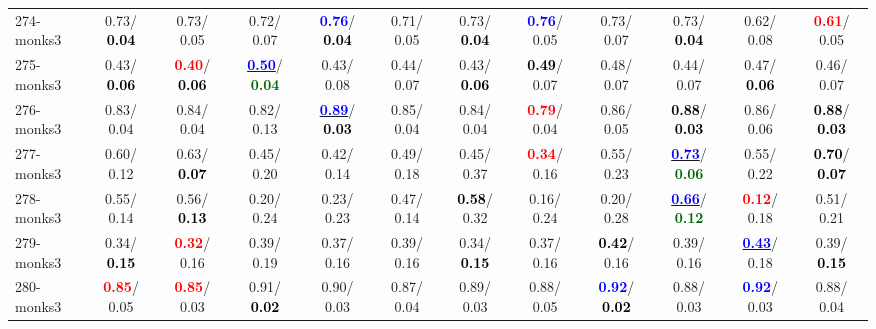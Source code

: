 \begin{table}[h]
\begin{center}
{\begin{tabular}{lc|c|c|c|c|c|c|c|c|c|c}
274-monks3 &   0.73/\textcolor{black}{\textbf{  0.04}} &   0.73/  0.05 &   0.72/  0.07 & \textcolor{blue}{\textbf{  0.76}}/\textcolor{black}{\textbf{  0.04}} &   0.71/  0.05 &   0.73/\textcolor{black}{\textbf{  0.04}} & \textcolor{blue}{\textbf{  0.76}}/  0.05 &   0.73/  0.07 &   0.73/\textcolor{black}{\textbf{  0.04}} &   0.62/  0.08 & \textcolor{red}{\textbf{  0.61}}/  0.05 \\
275-monks3 &   0.43/\textcolor{black}{\textbf{  0.06}} & \textcolor{red}{\textbf{  0.40}}/\textcolor{black}{\textbf{  0.06}} & \underline{\textcolor{blue}{\textbf{  0.50}}}/\textcolor{darkgreen}{\textbf{  0.04}} &   0.43/  0.08 &   0.44/  0.07 &   0.43/\textcolor{black}{\textbf{  0.06}} & \textcolor{black}{\textbf{  0.49}}/  0.07 &   0.48/  0.07 &   0.44/  0.07 &   0.47/\textcolor{black}{\textbf{  0.06}} &   0.46/  0.07 \\
276-monks3 &   0.83/  0.04 &   0.84/  0.04 &   0.82/  0.13 & \underline{\textcolor{blue}{\textbf{  0.89}}}/\textcolor{black}{\textbf{  0.03}} &   0.85/  0.04 &   0.84/  0.04 & \textcolor{red}{\textbf{  0.79}}/  0.04 &   0.86/  0.05 & \textcolor{black}{\textbf{  0.88}}/\textcolor{black}{\textbf{  0.03}} &   0.86/  0.06 & \textcolor{black}{\textbf{  0.88}}/\textcolor{black}{\textbf{  0.03}} \\
277-monks3 &   0.60/  0.12 &   0.63/\textcolor{black}{\textbf{  0.07}} &   0.45/  0.20 &   0.42/  0.14 &   0.49/  0.18 &   0.45/  0.37 & \textcolor{red}{\textbf{  0.34}}/  0.16 &   0.55/  0.23 & \underline{\textcolor{blue}{\textbf{  0.73}}}/\textcolor{darkgreen}{\textbf{  0.06}} &   0.55/  0.22 & \textcolor{black}{\textbf{  0.70}}/\textcolor{black}{\textbf{  0.07}} \\ \hline
278-monks3 &   0.55/  0.14 &   0.56/\textcolor{black}{\textbf{  0.13}} &   0.20/  0.24 &   0.23/  0.23 &   0.47/  0.14 & \textcolor{black}{\textbf{  0.58}}/  0.32 &   0.16/  0.24 &   0.20/  0.28 & \underline{\textcolor{blue}{\textbf{  0.66}}}/\textcolor{darkgreen}{\textbf{  0.12}} & \textcolor{red}{\textbf{  0.12}}/  0.18 &   0.51/  0.21 \\
279-monks3 &   0.34/\textcolor{black}{\textbf{  0.15}} & \textcolor{red}{\textbf{  0.32}}/  0.16 &   0.39/  0.19 &   0.37/  0.16 &   0.39/  0.16 &   0.34/\textcolor{black}{\textbf{  0.15}} &   0.37/  0.16 & \textcolor{black}{\textbf{  0.42}}/  0.16 &   0.39/  0.16 & \underline{\textcolor{blue}{\textbf{  0.43}}}/  0.18 &   0.39/\textcolor{black}{\textbf{  0.15}} \\
280-monks3 & \textcolor{red}{\textbf{  0.85}}/  0.05 & \textcolor{red}{\textbf{  0.85}}/  0.03 &   0.91/\textcolor{black}{\textbf{  0.02}} &   0.90/  0.03 &   0.87/  0.04 &   0.89/  0.03 &   0.88/  0.05 & \textcolor{blue}{\textbf{  0.92}}/\textcolor{black}{\textbf{  0.02}} &   0.88/  0.03 & \textcolor{blue}{\textbf{  0.92}}/  0.03 &   0.88/  0.04 \\

\end{tabular}}
\end{center}
\end{table}
